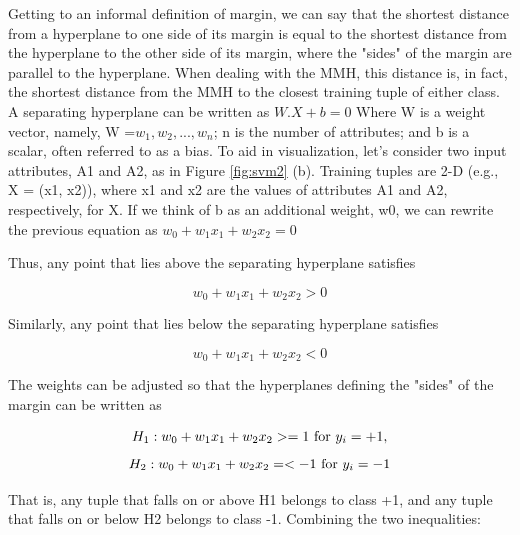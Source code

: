 Getting to an informal definition of margin, we can say that the shortest distance from a hyperplane to one side of its margin is equal to the shortest distance from the hyperplane to the other side of its margin, where the "sides" of the margin are parallel to the hyperplane. When dealing with the MMH, this distance is, in fact, the shortest distance from the MMH to the closest training tuple of either class. A separating hyperplane can be written as $W.X+b = 0$  Where W is a weight vector, namely, W =${  w_1,w_2,...,w_n }$; n is the number of attributes; and b is a scalar, often referred to as a bias. To aid in visualization, let's consider two input attributes, A1 and A2, as in Figure \ref{fig:svm2} (b). Training tuples are 2-D (e.g., X = (x1, x2)), where x1 and x2 are the values of attributes A1 and A2, respectively, for X. If we think of b as an additional weight, w0, we can rewrite the previous equation as $w_{0} + w_{1} x_{1}+w_{2} x_{2}=0$ \bigskip

Thus, any point that lies above the separating hyperplane satisfies

\begin{dBox}
\begin{equation}
w_0 + w_1 x_1 + w_2  x_2 > 0 
\end{equation}
\end{dBox}

Similarly, any point that lies below the separating hyperplane satisfies

\begin{dBox}
\begin{equation}
w_0 + w_1 x_1 + w_2  x_2 < 0 
\end{equation}
\end{dBox}

The weights can be adjusted so that the hyperplanes defining the "sides" of the margin can be written as

\begin{dBox}
\begin{equation}
H_1: w_0 + w_1 x_1 + w_2 x_2 >= 1    $ for $  y_i = +1,
\end{equation}
\begin{equation}
H_2: w_0 + w_1 x_1 + w_2 x_2 =< -1    $ for $ y_i = -1
\end{equation}
\end{dBox}

That is, any tuple that falls on or above H1 belongs to class +1, and any tuple that falls on or below H2 belongs to class -1. Combining the two inequalities:

